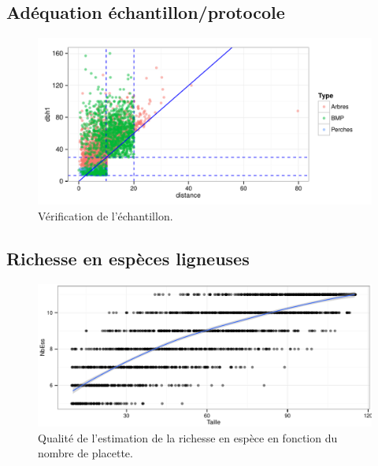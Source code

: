 \documentclass[a4paper]{book}\usepackage[]{graphicx}\usepackage[]{color}
\makeatletter
\def\maxwidth{ %
  \ifdim\Gin@nat@width>\linewidth
    \linewidth
  \else
    \Gin@nat@width
  \fi
}
\newenvironment{knitrout}{}{} %
\makeatother
\begin{document}
\subsection{Adéquation échantillon/protocole}
\begin{knitrout}
\color{fgcolor}\begin{figure}[h]


{\centering \includegraphics[width=\maxwidth]{Figures/DiamDist-1} 

}

\caption[Vérification de l'échantillon]{Vérification de l'échantillon.\label{fig:DiamDist}}
\end{figure}


\end{knitrout}

\subsection{Richesse en espèces ligneuses}
\begin{knitrout}
\color{fgcolor}\begin{figure}[h]


{\centering \includegraphics[width=\maxwidth]{Figures/Bootstrap-1} 

}

\caption[Qualité de l'estimation de la richesse en espèce en fonction du nombre de placette]{Qualité de l'estimation de la richesse en espèce en fonction du nombre de placette.\label{fig:Bootstrap}}
\end{figure}


\end{knitrout}
\end{document}
